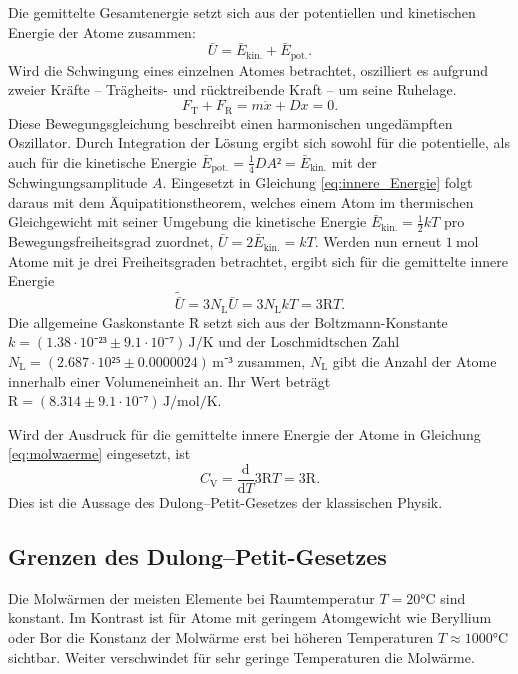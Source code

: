 Die gemittelte Gesamtenergie setzt sich aus der potentiellen und kinetischen Energie der Atome zusammen:
\begin{equation}
	\bar{U}=\bar{E}_\mathup{kin.}+\bar{E}_\mathup{pot.}.
	\label{eq:innere_Energie}
\end{equation}
Wird die Schwingung eines einzelnen Atomes betrachtet, oszilliert es aufgrund zweier Kräfte -- Trägheits- und rücktreibende Kraft -- um seine Ruhelage. 
\begin{equation}
	F_\mathup{T}+F_\mathup{R}=m\ddot{x}+Dx=0.
\end{equation}
Diese Bewegungsgleichung beschreibt einen harmonischen ungedämpften Oszillator. 
Durch Integration der Lösung ergibt sich sowohl für die potentielle, als auch für die kinetische Energie $\bar{E}_\mathup{pot.}=\frac{1}{4}DA²=\bar{E}_\mathup{kin.}$ mit der Schwingungsamplitude $A$.
Eingesetzt in Gleichung \eqref{eq:innere_Energie}
folgt daraus mit dem Äquipatitionstheorem, welches einem Atom im thermischen Gleichgewicht mit seiner Umgebung die kinetische Energie $\bar{E}_\mathup{kin.}=\frac{1}{2}kT$ pro Bewegungsfreiheitsgrad zuordnet, $\bar{U}=2\bar{E}_\mathup{kin.}=kT$. 
Werden nun erneut $\SI{1}{\mol}$ Atome mit je drei Freiheitsgraden betrachtet, ergibt sich für die gemittelte innere Energie 
\begin{equation}
	\tilde{\bar{U}}=3N_\mathup{L}\bar{U}=3N_\mathup{L}kT=3\text{R}T.
\end{equation}
Die allgemeine Gaskonstante $\text{R}$\cite{Gaskonstante} setzt sich aus der Boltzmann-Konstante \\$k=(1.38\cdot{10⁻²³}\pm9.1\cdot{10⁻⁷})\,\si{\joule\per\kelvin}$\cite{Boltzmannkonstante} und 
der Loschmidtschen Zahl \\$N_\mathup{L}=(2.687\cdot 10²⁵\pm0.0000024)\,\si{\meter}⁻³$\cite{Loschmidtzahl} zusammen,
$N_\mathup{L}$ gibt die Anzahl der Atome innerhalb einer Volumeneinheit an. 
Ihr Wert beträgt $\text{R}=(8.314\pm9.1\cdot{10⁻⁷})\,\si{\joule\per\mol\per\kelvin}$.

Wird der Ausdruck für die gemittelte innere Energie der Atome in Gleichung \eqref{eq:molwaerme} eingesetzt, ist
\begin{equation}
	C_\mathup{V}=\frac{\mathup{d}}{\mathup{d}T}3\text{R}T=3\text{R}.
\label{eq:dulong-petit}
\end{equation}
Dies ist die Aussage des Dulong--Petit-Gesetzes der klassischen Physik.\\
\subsection{Grenzen des Dulong--Petit-Gesetzes}
\label{sec:TheorieGrenze}
Die Molwärmen der meisten Elemente bei Raumtemperatur $T=20\si{\celsius}$ sind konstant.
Im Kontrast ist für Atome mit geringem Atomgewicht wie Beryllium oder Bor die Konstanz der Molwärme erst bei höheren Temperaturen $T\approx{1000\si{\celsius}}$ sichtbar. 
Weiter verschwindet für sehr geringe Temperaturen die Molwärme.

